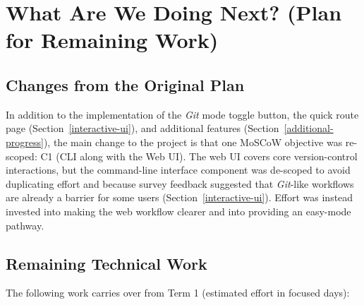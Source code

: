 \section{What Are We Doing Next? (Plan for Remaining Work)}
\label{sec:next}

\subsection{Changes from the Original Plan}

In addition to the implementation of the \textit{Git} mode toggle button, the quick route page (Section~\ref{interactive-ui}), and additional features (Section~\ref{additional-progress}), the main change to the project is that one MoSCoW objective was re-scoped: C1 (CLI along with the Web UI). The web UI covers core version-control interactions, but the command-line interface component was de-scoped to avoid duplicating effort and because survey feedback suggested that \textit{Git}-like workflows are already a barrier for some users (Section~\ref{interactive-ui}). Effort was instead invested into making the web workflow clearer and into providing an easy-mode pathway.

\subsection{Remaining Technical Work}
\label{remaining-work}
The following work carries over from Term 1 (estimated effort in focused days):

